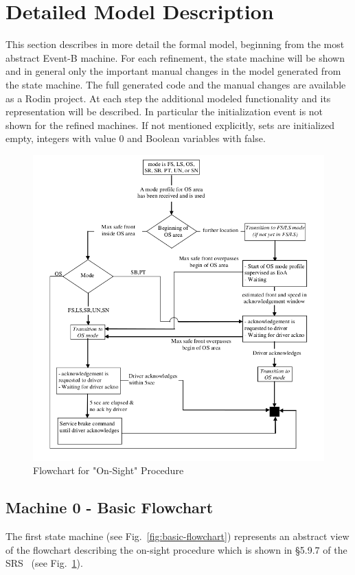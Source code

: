 \documentclass{template/openetcs_article}
\begin{document}
\section{Detailed Model Description}
\label{sec:deta-model-descr}

This section describes in more detail the formal model, beginning from the most
abstract Event-B machine.  For each refinement, the state machine will be shown
and in general only the important manual changes in the model generated from the
state machine. The full generated code and the manual changes are available as a
Rodin project. At each step the additional modeled functionality and its
representation will be described. In particular the initialization event is not
shown for the refined machines. If not mentioned explicitly, sets are
initialized empty, integers with value 0 and Boolean variables with false.

\begin{figure}[ht]
  \centering
  \includegraphics[width=.75\textwidth]{FlowChart}
  \caption{Flowchart for "On-Sight" Procedure~\cite{SRS-026-330}}
  \label{fig:flowchart-OS-mode}
\end{figure}

\subsection{Machine 0 - Basic Flowchart}
\label{sec:machine-0-basic}

The first state machine  (see Fig.~\ref{fig:basic-flowchart})
represents an abstract view of the flowchart describing the on-sight procedure
which is shown in §5.9.7 of the SRS~\cite{SRS-026-330} (see
Fig.~\ref{fig:flowchart-OS-mode}).
\end{document}
